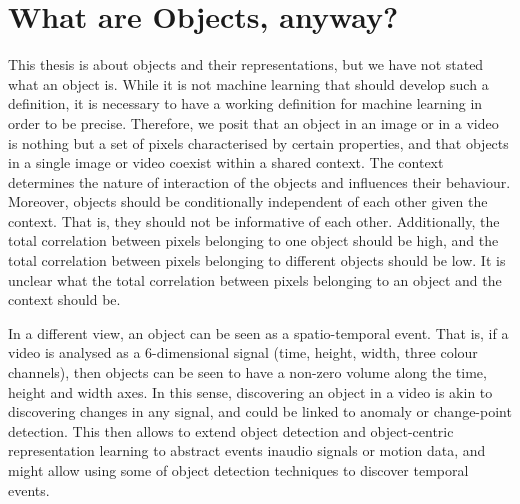 \section{What are Objects, anyway?}
\label{sec:what_are_objects}
This thesis is about objects and their representations, but we have not stated what an object is. 
While it is not machine learning that should develop such a definition, it is necessary to have a working definition for machine learning in order to be precise.
Therefore, we posit that an object in an image or in a video is nothing but a set of pixels characterised by certain properties, and that objects in a single image or video coexist within a shared context.
The context determines the nature of interaction of the objects and influences their behaviour.
Moreover, objects should be conditionally independent of each other given the context.
That is, they should not be informative of each other.
Additionally, the total correlation between pixels belonging to one object should be high, and the total correlation between pixels belonging to different objects should be low.
It is unclear what the total correlation between pixels belonging to an object and the context should be.

In a different view, an object can be seen as a spatio-temporal event.
That is, if a video is analysed as a 6-dimensional signal (time, height, width, three colour channels), then objects can be seen to have a non-zero volume along the time, height and width axes.
In this sense, discovering an object in a video is akin to discovering changes in any signal, and could be linked to anomaly or change-point detection.
This then allows to extend object detection and object-centric representation learning to abstract events in\eg audio signals or motion data, and might allow using some of object detection techniques to discover temporal events.